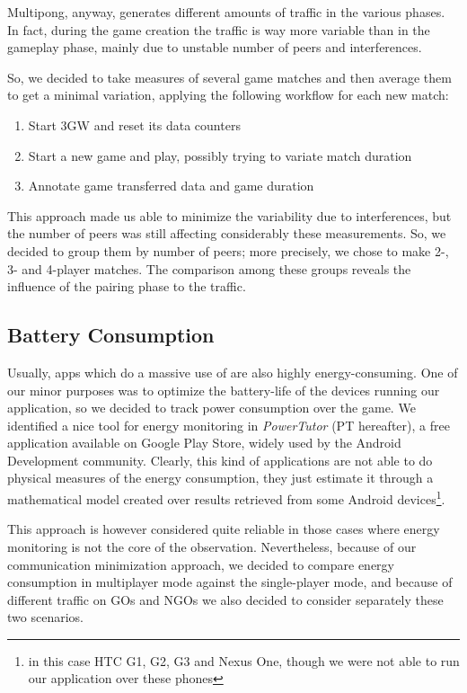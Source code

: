 Multipong, anyway, generates different amounts of traffic in the various
phases. In fact, during the game creation the traffic is way more variable than
in the gameplay phase, mainly due to unstable number of peers and \wifi{}
interferences.

So, we decided to take measures of several game matches and then average them to get a minimal variation, applying the following workflow for each new match:

\begin{enumerate} %
  \item Start 3GW and reset its data counters
  \item Start a new game and play, possibly trying to variate match duration
  \item Annotate game transferred data and game duration
\end{enumerate}

This approach made us able to minimize the variability due to interferences, but the number of peers was still affecting considerably these measurements. So, we decided to group them by number of peers; more precisely, we chose to make 2-, 3- and 4-player matches. The comparison among these groups reveals the influence of the pairing phase to the traffic.

\subsection{Battery Consumption}

Usually, apps which do a massive use of \wifi{} are also highly energy-consuming. One of our minor purposes was to optimize the battery-life of the devices running our application, so we decided to track power consumption over the game. We identified a nice tool for energy monitoring in \textit{PowerTutor} (PT hereafter), a free application available on Google Play Store, widely used by the Android Development community. Clearly, this kind of applications are not able to do physical measures of the energy consumption, they just estimate it through a mathematical model created over results retrieved from some Android devices\footnote{in this case HTC G1, G2, G3 and Nexus One, though we were not able to run our application over these phones}.

This approach is however considered quite reliable in those cases where energy monitoring is not the core of the observation. Nevertheless, because of our communication minimization approach, we decided to compare energy consumption in multiplayer mode against the single-player mode, and because of different traffic on GOs and NGOs we also decided to consider separately these two scenarios.
